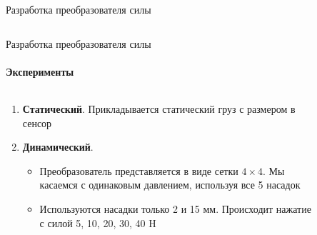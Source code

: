 \documentclass[aspectratio=169,xcolor=table]{beamer}
\begin{document}
\begin{frame}[t]{Разработка преобразователя силы}
\begin{columns}[T,onlytextwidth]
\begin{column}{0.39\textwidth}
        \end{column}
    \end{columns}
\end{frame}




\begin{frame}[t]{Разработка преобразователя силы}
    \framesubtitle{Эксперименты}
    \vspace{-15pt}
    \begin{columns}[T,onlytextwidth]
        \begin{column}{0.6\textwidth}
            {\large
                \begin{enumerate}
                    \item \textbf{Статический}. Прикладывается статический груз с размером в сенсор
                          \item\textbf{Динамический}.
                          \begin{itemize}
                            \large
                              \item Преобразователь представляется в виде сетки $4\times4$. Мы касаемся с одинаковым давлением, используя все 5 насадок
                              \item Используются насадки только 2 и 15 мм. Происходит нажатие с силой 5, 10, 20, 30, 40 H
                          \end{itemize}
                \end{enumerate}
            }
        \end{column}
        \begin{column}{0.39\textwidth}
            \vspace{-0.5cm}
            \begin{figure}[H]
                \centering
\end{figure}
\end{column}
\end{columns}
\end{frame}
\end{document}
